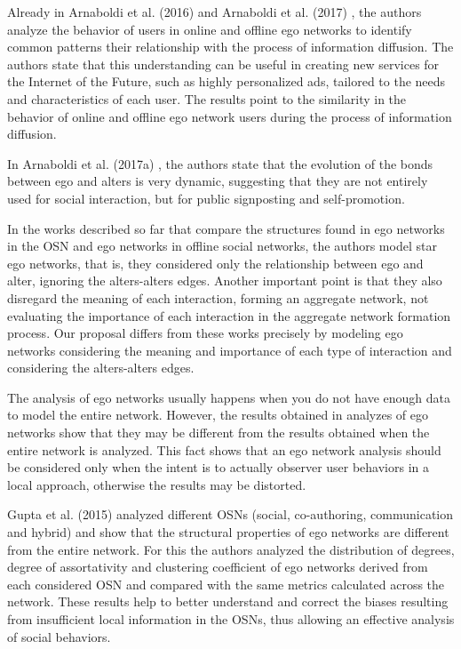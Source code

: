 Already in Arnaboldi et al. (2016) \cite{Arnaboldi:2016} and Arnaboldi et al. (2017) \cite{ARNABOLDI2017}, the authors analyze the behavior of users in online and offline ego networks to identify common patterns their relationship with the process of information diffusion. The authors state that this understanding can be useful in creating new services for the Internet of the Future, such as highly personalized ads, tailored to the needs and characteristics of each user. The results point to the similarity in the behavior of online and offline ego network users during the process of information diffusion.

In Arnaboldi et al. (2017a) \cite{Arnaboldi:2017a}, the authors state that the evolution of the bonds between ego and alters is very dynamic, suggesting that they are not entirely used for social interaction, but for public signposting and self-promotion.

In the works described so far that compare the structures found in ego networks in the OSN and ego networks in offline social networks, the authors model star ego networks, that is, they considered only the relationship between ego and alter, ignoring the alters-alters edges. Another important point is that they also disregard the meaning of each interaction, forming an aggregate network, not evaluating the importance of each interaction in the aggregate network formation process. Our proposal differs from these works precisely by modeling ego networks considering the meaning and importance of each type of interaction and considering the alters-alters edges.

The analysis of ego networks usually happens when you do not have enough data to model the entire network. However, the results obtained in analyzes of ego networks show that they may be different from the results obtained when the entire network is analyzed. This fact shows that an ego network analysis should be considered only when the intent is to actually observer user behaviors in a local approach, otherwise the results may be distorted.

Gupta et al. (2015) \cite{Gupta2015} analyzed different OSNs (social, co-authoring, communication and hybrid) and show that the structural properties of ego networks are different from the entire network. For this the authors analyzed the distribution of degrees, degree of assortativity and clustering coefficient of ego networks derived from each considered OSN and compared with the same metrics calculated across the network. These results help to better understand and correct the biases resulting from insufficient local information in the OSNs, thus allowing an effective analysis of social behaviors.

